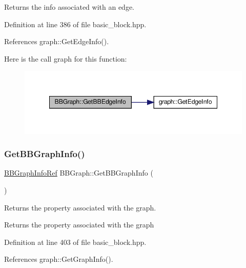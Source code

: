 Returns the info associated with an edge. 



Definition at line 386 of file basic\+\_\+block.\+hpp.



References graph\+::\+Get\+Edge\+Info().

Here is the call graph for this function\+:
\nopagebreak
\begin{figure}[H]
\begin{center}
\leavevmode
\includegraphics[width=348pt]{dd/d5f/structBBGraph_a59fd37fa481d216fc19b00e369496ee4_cgraph}
\end{center}
\end{figure}
\mbox{\label{structBBGraph_ad0b39f19870684dc311670bfcfa0549b}} 
\subsubsection{\texorpdfstring{Get\+B\+B\+Graph\+Info()}{GetBBGraphInfo()}}
{\footnotesize\ttfamily \hyperlink{basic__block_8hpp_a7fedb7a9906aec21ae08b9f603e42b6d}{B\+B\+Graph\+Info\+Ref} B\+B\+Graph\+::\+Get\+B\+B\+Graph\+Info (\begin{DoxyParamCaption}{ }\end{DoxyParamCaption})\hspace{0.3cm}{\ttfamily [inline]}}



Returns the property associated with the graph. 

\begin{DoxyReturn}{Returns}
the property associated with the graph 
\end{DoxyReturn}


Definition at line 403 of file basic\+\_\+block.\+hpp.



References graph\+::\+Get\+Graph\+Info().

